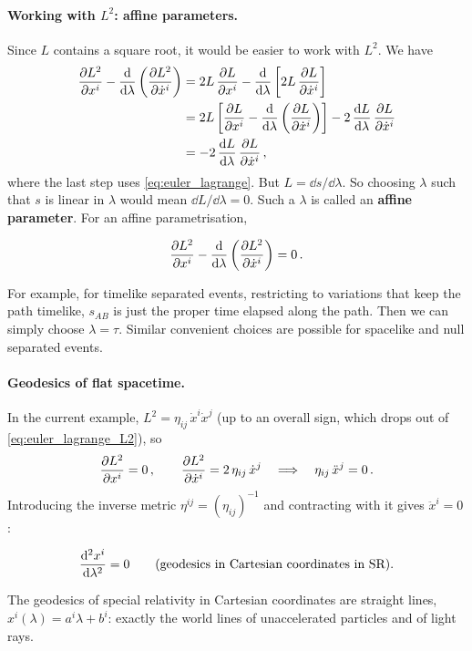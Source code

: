 \paragraph{Working with $L^2$: affine parameters.}
Since $L$ contains a square root, it would be easier to work with $L^2$. We have
\begin{align}
    \frac{\partial L^2}{\partial x^i} - \frac{\mathrm{d} }{\mathrm{d} \lambda} \left( \frac{\partial L^2}{\partial \dot{x}^i} \right)
     & = 2L\, \frac{\partial L}{\partial x^i} - \frac{\mathrm{d} }{\mathrm{d} \lambda} \left[ 2L\, \frac{\partial L}{\partial \dot{x}^i} \right] \nonumber \\
     & = 2L \left[ \frac{\partial L}{\partial x^i} - \frac{\mathrm{d} }{\mathrm{d} \lambda} \left( \frac{\partial L}{\partial \dot{x}^i} \right) \right]
    - 2\, \frac{\mathrm{d} L}{\mathrm{d} \lambda}\, \frac{\partial L}{\partial \dot{x}^i} \nonumber \\
     & = -2\, \frac{\mathrm{d} L}{\mathrm{d} \lambda}\, \frac{\partial L}{\partial \dot{x}^i} \, ,
\end{align}
where the last step uses \eqref{eq:euler_lagrange}. But $L = \dd s / \dd\lambda$. So choosing
$\lambda$ such that $s$ is linear in $\lambda$ would mean $\dd L / \dd\lambda = 0$. Such a
$\lambda$ is called an \textbf{affine parameter}. For an affine parametrisation,
\begin{keyresult}
    \begin{equation}
        \frac{\partial L^2}{\partial x^i} - \frac{\mathrm{d} }{\mathrm{d} \lambda} \left( \frac{\partial L^2}{\partial \dot{x}^i} \right) = 0 \, .
        \label{eq:euler_lagrange_L2}
    \end{equation}
\end{keyresult}
For example, for timelike separated events, restricting to variations that keep the path timelike,
$s_{AB}$ is just the proper time elapsed along the path. Then we can simply choose
$\lambda = \tau$. Similar convenient choices are possible for spacelike and null separated events.

\paragraph{Geodesics of flat spacetime.}
In the current example, $L^2 = \eta_{ij}\, \dot{x}^i \dot{x}^j$ (up to an overall sign, which
drops out of \eqref{eq:euler_lagrange_L2}), so
\begin{equation}
    \frac{\partial L^2}{\partial x^i} = 0 \, , \qquad \frac{\partial L^2}{\partial \dot{x}^i} = 2\, \eta_{ij}\, \dot{x}^j
    \quad\Longrightarrow\quad
    \eta_{ij}\, \ddot{x}^j = 0 \, .
\end{equation}
Introducing the inverse metric $\eta^{ij} = (\eta_{ij})^{-1}$ and contracting with it gives
$\ddot{x}^i = 0$:
\begin{keyresult}
    \begin{equation}
        \frac{\mathrm{d} ^2 x^i}{\mathrm{d} \lambda^2} = 0 \qquad \text{(geodesics in Cartesian coordinates in SR).}
        \label{eq:geodesic_sr}
    \end{equation}
\end{keyresult}
The geodesics of special relativity in Cartesian coordinates are straight lines,
$x^i(\lambda) = a^i \lambda + b^i$: exactly the world lines of unaccelerated particles and of
light rays.

